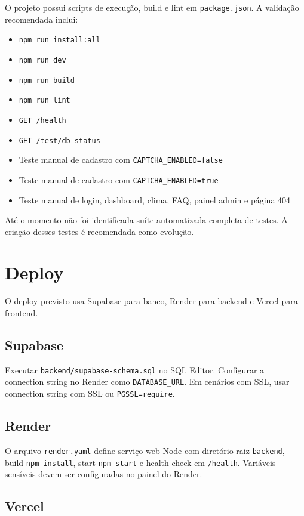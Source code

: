 \documentclass[
  12pt,
  oneside,
  a4paper,
  brazil
]{abntex2}
\begin{document}
O projeto possui scripts de execução, build e lint em \texttt{package.json}. A validação recomendada inclui:

\begin{itemize}
  \item \texttt{npm run install:all}
  \item \texttt{npm run dev}
  \item \texttt{npm run build}
  \item \texttt{npm run lint}
  \item \texttt{GET /health}
  \item \texttt{GET /test/db-status}
  \item Teste manual de cadastro com \texttt{CAPTCHA\_ENABLED=false}
  \item Teste manual de cadastro com \texttt{CAPTCHA\_ENABLED=true}
  \item Teste manual de login, dashboard, clima, FAQ, painel admin e página 404
\end{itemize}

Até o momento não foi identificada suíte automatizada completa de testes. A criação desses testes é recomendada como evolução.

\chapter{Deploy}

O deploy previsto usa Supabase para banco, Render para backend e Vercel para frontend.

\section{Supabase}

Executar \texttt{backend/supabase-schema.sql} no SQL Editor. Configurar a connection string no Render como \texttt{DATABASE\_URL}. Em cenários com SSL, usar connection string com SSL ou \texttt{PGSSL=require}.

\section{Render}

O arquivo \texttt{render.yaml} define serviço web Node com diretório raiz \texttt{backend}, build \texttt{npm install}, start \texttt{npm start} e health check em \texttt{/health}. Variáveis sensíveis devem ser configuradas no painel do Render.

\section{Vercel}
\end{document}
